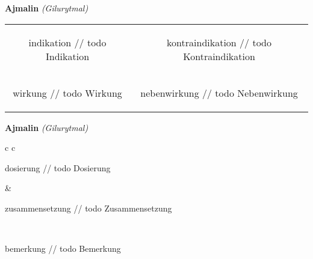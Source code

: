 \documentclass[12pt]{beamer}
\begin{document}
\begin{frame}{
    \textbf{Ajmalin}
    \textit{(Gilurytmal)}
}
    \begin{tabular}{c c}
        \begin{beamercolorbox}[wd=\boxwidth\textwidth,ht=\boxheight\textheight,sep=1em]{indikation}
        // todo Indikation
        \end{beamercolorbox} & 
        \begin{beamercolorbox}[wd=\boxwidth\textwidth,ht=\boxheight\textheight,sep=1em]{kontraindikation}
        // todo Kontraindikation 
        \end{beamercolorbox} \\
        \begin{beamercolorbox}[wd=\boxwidth\textwidth,ht=\boxheight\textheight,sep=1em]{wirkung}
        // todo Wirkung
        \end{beamercolorbox} & 
        \begin{beamercolorbox}[wd=\boxwidth\textwidth,ht=\boxheight\textheight,sep=1em]{nebenwirkung}
        // todo Nebenwirkung
        \end{beamercolorbox} \\
    \end{tabular}
\end{frame}

\begin{frame}{
    \textbf{Ajmalin}
    \textit{(Gilurytmal)}
}
    \begin{tabular}{c c}
        \begin{beamercolorbox}[wd=\boxwidth\textwidth,ht=\boxheight\textheight,sep=1em]{dosierung}
        // todo Dosierung
        \end{beamercolorbox} & 
        \begin{beamercolorbox}[wd=\boxwidth\textwidth,ht=\boxheight\textheight,sep=1em]{zusammensetzung}
        // todo Zusammensetzung
        \end{beamercolorbox} \\
        \begin{beamercolorbox}[wd=\textwidth,ht=\boxheight\textheight,sep=1em]{bemerkung}
        // todo Bemerkung
        \end{beamercolorbox} \\
    \end{tabular}
\end{frame}
\end{document}

